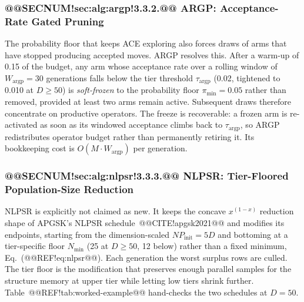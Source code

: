\documentclass[10pt,a4paper]{article}
\begin{document}
\subsubsection{@@SECNUM!sec:alg:argp!3.3.2.@@ ARGP: Acceptance-Rate Gated Pruning}\label{sec:alg:argp}

The probability floor that keeps ACE exploring also forces draws of
arms that have stopped producing accepted moves.
ARGP resolves this. After a warm-up of 0.15 of
the budget, any arm whose acceptance rate over a rolling window of
$W_{\text{argp}}=30$ generations falls below the tier threshold
$\tau_{\text{argp}}$ (0.02, tightened to 0.010 at $D\ge50$) is
\emph{soft-frozen} to the probability floor $\pi_{\min}=0.05$ rather than removed,
provided at least two arms remain active. Subsequent draws therefore
concentrate on productive operators.  The freeze is recoverable: a frozen arm is re-activated
as soon as its windowed acceptance climbs back to $\tau_{\text{argp}}$, so ARGP
redistributes operator budget rather than permanently retiring it. 
Its bookkeeping cost is $O(M\cdot W_{\text{argp}})$ per
generation. 

\subsubsection{@@SECNUM!sec:alg:nlpsr!3.3.3.@@ NLPSR: Tier-Floored Population-Size Reduction}\label{sec:alg:nlpsr}

NLPSR is explicitly not claimed as new. It keeps the concave $x^{(1-x)}$
reduction shape of APGSK's NLPSR schedule~@@CITE!apgsk2021@@ and
modifies its endpoints, starting from the dimension-scaled
$NP_{\text{init}}=5D$ and bottoming at a tier-specific floor
$N_{\min}$ (25 at $D\ge50$, 12 below) rather than a fixed minimum,
Eq.~(@@REF!eq:nlpsr@@). Each generation the worst surplus rows are
culled. 
The tier floor is the modification that preserves enough parallel
samples for the structure memory at upper tier while letting low
tiers shrink further.
Table~@@REF!tab:worked-example@@ hand-checks the two schedules at
$D=50$.
\end{document}
